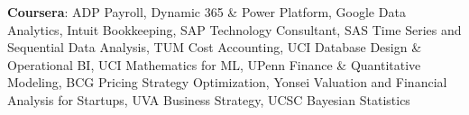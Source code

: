 \textbf{Coursera}: ADP Payroll, Dynamic 365 \& Power Platform, Google Data Analytics, Intuit Bookkeeping, SAP Technology Consultant, SAS Time Series and Sequential Data Analysis, TUM Cost Accounting, UCI Database Design \& Operational BI, UCI Mathematics for ML, UPenn Finance \& Quantitative Modeling, BCG Pricing Strategy Optimization, Yonsei Valuation and Financial Analysis for Startups, UVA Business Strategy, UCSC Bayesian Statistics

